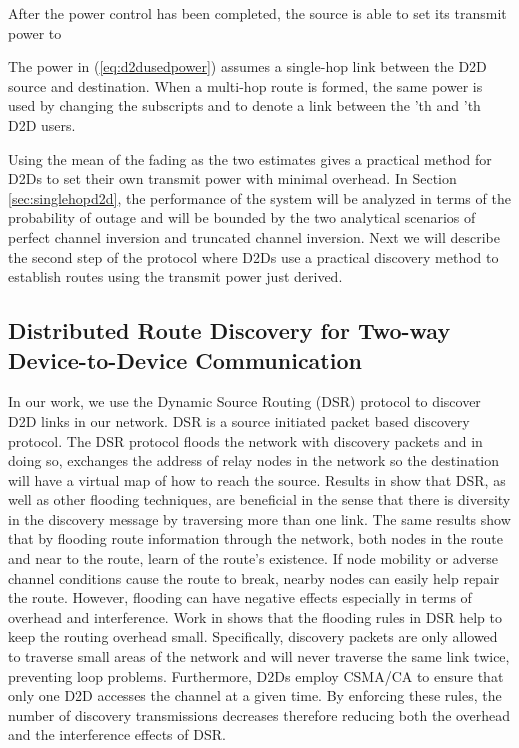 \documentclass[10pt, final, journal, letterpaper,oneside, twocolumn]{IEEEtran}
\begin{document}
After the power control has been completed, the source is able to set its transmit power to 
  
The power in (\ref{eq:d2dusedpower}) assumes a single-hop link between the D2D source and destination.  When a multi-hop route is formed, the same power is used by changing the subscripts  and  to denote a link between the 'th and 'th D2D users.  

Using the mean of the fading as the two estimates gives a practical method for D2Ds to set their own transmit power with minimal overhead.  In Section \ref{sec:singlehopd2d}, the performance of the system will be analyzed in terms of the probability of outage and will be bounded by the two analytical scenarios of perfect channel inversion and truncated channel inversion.  Next we will describe the second step of the protocol where D2Ds use a practical discovery method to establish routes using the transmit power just derived.  



\subsection{Distributed Route Discovery for Two-way Device-to-Device Communication}  
\label{sec:discover_protocol}
In our work, we use the Dynamic Source Routing (DSR) protocol\cite{dsr_original} to discover D2D links in our network.  DSR is a source initiated packet based discovery protocol.  The DSR protocol floods the network with discovery packets and in doing so, exchanges the address of relay nodes in the network so the destination will have a virtual map of how to reach the source.  Results in \cite{flood_routing_loh,flood_jun} show that DSR, as well as other flooding techniques, are beneficial in the sense that there is diversity in the discovery message by traversing more than one link.  The same results show that by flooding route information through the network, both nodes in the route and near to the route, learn of the route's existence.  If node mobility or adverse channel conditions cause the route to break, nearby nodes can easily help repair the route.  However, flooding can have negative effects especially in terms of overhead and interference.  Work in \cite{dsr3} shows that the flooding rules in DSR help to keep the routing overhead small.  Specifically, discovery packets are only allowed to traverse small areas of the network and will never traverse the same link twice, preventing loop problems.  Furthermore, D2Ds employ CSMA/CA to ensure that only one D2D accesses the channel at a given time.  By enforcing these rules, the number of discovery transmissions decreases therefore reducing both the overhead and the interference effects of DSR.  
\end{document}
